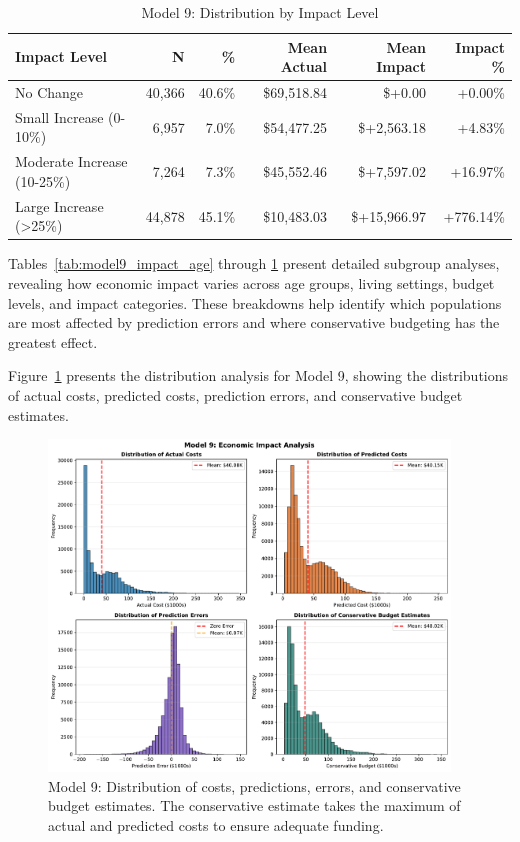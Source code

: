 \begin{table}[htbp]
\centering
\small
\caption{Model 9: Distribution by Impact Level}
\label{tab:model9_impact_distribution}
\begin{tabular}{lrrrrr}
\toprule
\textbf{Impact Level} & \textbf{N} & \textbf{\%} & \textbf{Mean Actual} & \textbf{Mean Impact} & \textbf{Impact \%} \\
\midrule
No Change & 40,366 & 40.6\% & \$69,518.84 & \$+0.00 & +0.00\% \\
Small Increase (0-10\%) & 6,957 & 7.0\% & \$54,477.25 & \$+2,563.18 & +4.83\% \\
Moderate Increase (10-25\%) & 7,264 & 7.3\% & \$45,552.46 & \$+7,597.02 & +16.97\% \\
Large Increase (>25\%) & 44,878 & 45.1\% & \$10,483.03 & \$+15,966.97 & +776.14\% \\
\bottomrule
\end{tabular}
\end{table}

Tables~\ref{tab:model9_impact_age} through \ref{tab:model9_impact_distribution} present detailed subgroup analyses, revealing how economic impact varies across age groups, living settings, budget levels, and impact categories. These breakdowns help identify which populations are most affected by prediction errors and where conservative budgeting has the greatest effect.

Figure~\ref{fig:model9_impact_histograms} presents the distribution analysis for Model 9, showing the distributions of actual costs, predicted costs, prediction errors, and conservative budget estimates.

\begin{figure}[htbp]
\centering
\includegraphics[width=0.95\textwidth]{figures/model_9_Impact_Histograms.pdf}
\caption{Model 9: Distribution of costs, predictions, errors, and conservative budget estimates. The conservative estimate takes the maximum of actual and predicted costs to ensure adequate funding.}
\label{fig:model9_impact_histograms}
\end{figure}

